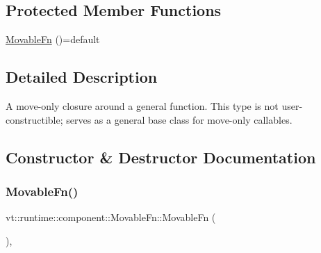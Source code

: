 \subsection*{Protected Member Functions}
\begin{DoxyCompactItemize}
\item 
\hyperlink{structvt_1_1runtime_1_1component_1_1_movable_fn_a1f4e6234a09bf4d9a08c79c1945ede55}{Movable\+Fn} ()=default
\end{DoxyCompactItemize}


\subsection{Detailed Description}
A move-\/only closure around a general function. This type is not user-\/constructible; serves as a general base class for move-\/only callables. 



\subsection{Constructor \& Destructor Documentation}
\mbox{\label{structvt_1_1runtime_1_1component_1_1_movable_fn_a1f4e6234a09bf4d9a08c79c1945ede55}} 
\subsubsection{\texorpdfstring{Movable\+Fn()}{MovableFn()}\hspace{0.1cm}{\footnotesize\ttfamily [1/3]}}
{\footnotesize\ttfamily vt\+::runtime\+::component\+::\+Movable\+Fn\+::\+Movable\+Fn (\begin{DoxyParamCaption}{ }\end{DoxyParamCaption})\hspace{0.3cm}{\ttfamily [protected]}, {\ttfamily [default]}}

\mbox{\label{structvt_1_1runtime_1_1component_1_1_movable_fn_ab74d7289ccfbca29df1487af4cdd1f52}} 
